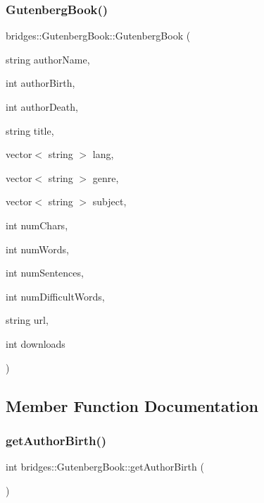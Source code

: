 \subsubsection{\texorpdfstring{Gutenberg\+Book()}{GutenbergBook()}\hspace{0.1cm}{\footnotesize\ttfamily [2/2]}}
{\footnotesize\ttfamily bridges\+::\+Gutenberg\+Book\+::\+Gutenberg\+Book (\begin{DoxyParamCaption}\item[{string}]{author\+Name,  }\item[{int}]{author\+Birth,  }\item[{int}]{author\+Death,  }\item[{string}]{title,  }\item[{vector$<$ string $>$}]{lang,  }\item[{vector$<$ string $>$}]{genre,  }\item[{vector$<$ string $>$}]{subject,  }\item[{int}]{num\+Chars,  }\item[{int}]{num\+Words,  }\item[{int}]{num\+Sentences,  }\item[{int}]{num\+Difficult\+Words,  }\item[{string}]{url,  }\item[{int}]{downloads }\end{DoxyParamCaption})\hspace{0.3cm}{\ttfamily [inline]}}



\subsection{Member Function Documentation}
\mbox{\label{classbridges_1_1_gutenberg_book_a86f4ea70ec32fd1cce772910b9dcc9a6}} 
\subsubsection{\texorpdfstring{get\+Author\+Birth()}{getAuthorBirth()}}
{\footnotesize\ttfamily int bridges\+::\+Gutenberg\+Book\+::get\+Author\+Birth (\begin{DoxyParamCaption}{ }\end{DoxyParamCaption})\hspace{0.3cm}{\ttfamily [inline]}}

